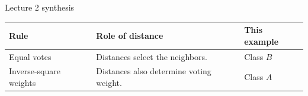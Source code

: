 \documentclass[11pt,a4paper]{article}
\begin{document}
\begin{reviewsynthesis}{Lecture 2 synthesis}
{
\begin{tabularx}{\linewidth}{@{}P{29mm}|Y|P{22mm}@{}}
\textbf{Rule} & \textbf{Role of distance} & \textbf{This example} \\\hline
Equal votes & Distances select the neighbors. & Class $B$ \\\hline
Inverse-square weights & Distances also determine voting weight. & Class $A$ \\
\end{tabularx}}
\end{reviewsynthesis}
\end{document}
